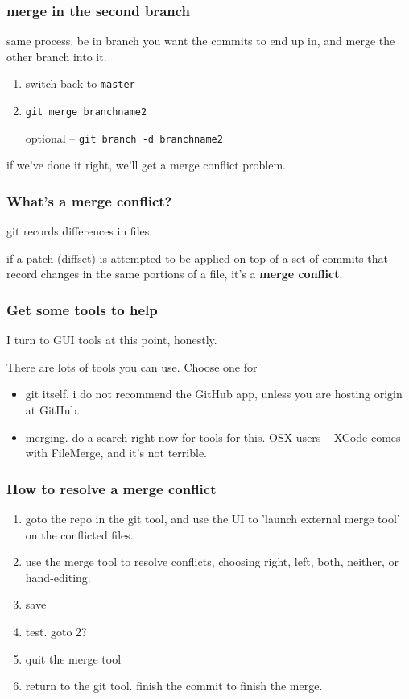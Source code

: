 \documentclass[14pt,aspectratio=1610]{beamer} %
\newcommand{\fframe}[2]{
   \begin{frame}
\frametitle{#1}
#2
\end{frame}
}
\begin{document}
\fframe{merge in the second branch}
{
	same process.  be in branch you want the commits to end up in, and merge the other branch into it.

\vspace{\baselineskip}

		\begin{enumerate}
		\item switch back to {\tt master}
		\item {\tt git merge  branchname2}
		\item [optional] -- {\tt git branch -d branchname2}
	\end{enumerate}

	if we've done it right, we'll get a merge conflict problem.  
}




\fframe{What's a merge conflict?}
{
	git records differences in files.

	if a patch (diffset) is attempted to be applied on top of a set of commits that record changes in the same portions of a file, it's a {\bf merge conflict}.

}

\fframe{Get some tools to help}
{
	I turn to GUI tools at this point, honestly.

	There are lots of tools you can use.  Choose one for 
	\begin{itemize}
		\item git itself.  i do not recommend the GitHub app, unless you are hosting origin at GitHub.
		\item merging.  do a search right now for tools for this.  
		OSX users -- XCode comes with FileMerge, and it's not terrible.
		\end{itemize} 


}

\fframe{How to resolve a merge conflict}
{

		\begin{enumerate}
			\item goto the repo in the git tool, and use the UI to 'launch external merge tool' on the conflicted files.
			\item use the merge tool to resolve conflicts, choosing right, left, both, neither, or hand-editing.
			\item save
			\item test.  goto 2?
			\item quit the merge tool
			\item return to the git tool.  finish the commit to finish the merge.  
		\end{enumerate}

}
\end{document}
